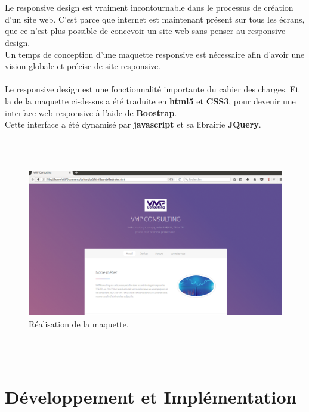 \documentclass[12pt]{article}
\begin{document}
\\ \\


Le responsive design est vraiment incontournable dans le processus de création d’un site web.  C'est parce que internet est maintenant présent sur tous les écrans, que ce n'est plus possible de concevoir un site web sans penser au responsive design.\\
Un temps de conception d'une maquette responsive est nécessaire afin d'avoir une vision globale et précise de site responsive.\\ \\
Le responsive design est une fonctionnalité importante du cahier des charges.
Et la  de la maquette ci-dessus  a été traduite en \textbf{html5} et \textbf{CSS3}, pour devenir une  interface web responsive
 à l'aide de \textbf{Boostrap}.\\
Cette interface a été  dynamisé par \textbf{javascript} et sa librairie \textbf{JQuery}.
 
 \\
 \\

\begin{center}
\begin{figure}[htp]
  \centering
  \includegraphics[width=12cm]{design1.png}
  \caption{Réalisation de la maquette.}
  \label{fig:une-autre-image}
\end{figure}
\end{center}

\\ \\ 


\newpage

\section{Développement et Implémentation}
\end{document}
